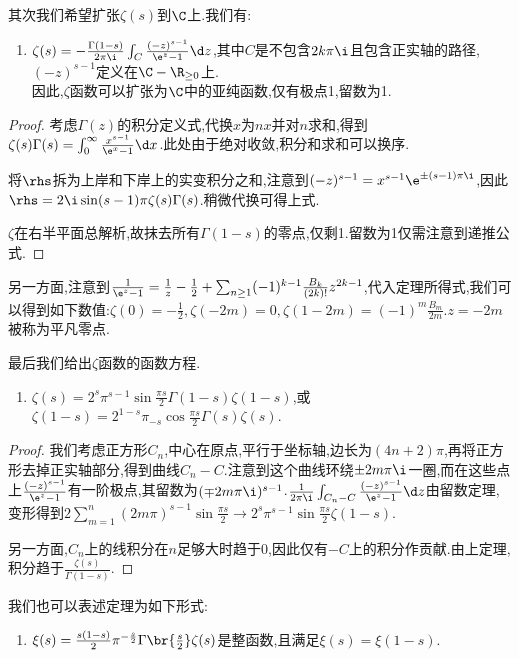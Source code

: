 \documentclass{article}
\begin{document}
其次我们希望扩张$\zeta(s)$到$\C$上.我们有:
\begin{enumerate}[resume]
    \item $\zeta(s)=-\frac{\Gamma(1-s)}{2\pi\i}\int_C\frac{(-z)^{s-1}}{\e^z-1}\d z$,其中$C$是不包含$2k\pi\i$且包含正实轴的路径,$(-z)^{s-1}$定义在$\C-\R_{\geq 0}$上.\\
    因此,$\zeta$函数可以扩张为$\C$中的亚纯函数,仅有极点1,留数为1.
\end{enumerate}
\begin{proof}
    考虑$\Gamma(z)$的积分定义式,代换$x$为$nx$并对$n$求和,得到$\zeta(s)\Gamma(s)=\int_0^\infty\frac{x^{s-1}}{\e^x-1}\d x$.此处由于绝对收敛,积分和求和可以换序.

    将$\rhs$拆为上岸和下岸上的实变积分之和,注意到$(-z)^{s-1}=x^{s-1}\e^{\pm(s-1)\pi\i}$,因此$\rhs=2\i\sin(s-1)\pi\zeta(s)\Gamma(s)$.稍微代换可得上式.

    $\zeta$在右半平面总解析,故抹去所有$\Gamma(1-s)$的零点,仅剩1.留数为1仅需注意到递推公式.
\end{proof}

另一方面,注意到$\frac{1}{\e^z-1}=\frac{1}{z}-\frac{1}{2}+\sum_{n\geq 1}(-1)^{k-1}\frac{B_k}{(2k)!}z^{2k-1}$,\hint{\tbc}代入定理所得式,我们可以得到如下数值:$\zeta(0)=-\frac{1}{2},\zeta(-2m)=0,\zeta(1-2m)=(-1)^m\frac{B_m}{2m}$.$z=-2m$被称为平凡零点.

最后我们给出$\zeta$函数的函数方程.
\begin{enumerate}[resume]
    \item $\zeta(s)=2^s\pi^{s-1}\sin\frac{\pi s}{2}\Gamma(1-s)\zeta(1-s)$,或$\zeta(1-s)=2^{1-s}\pi_{-s}\cos\frac{\pi s}{2}\Gamma(s)\zeta(s)$.
\end{enumerate}
\begin{proof}
    我们考虑正方形$C_n$,中心在原点,平行于坐标轴,边长为$(4n+2)\pi$,再将正方形去掉正实轴部分,得到曲线$C_n-C$.注意到这个曲线环绕$\pm 2m\pi\i$一圈,而在这些点上$\frac{(-z)^{s-1}}{\e^z-1}$有一阶极点,其留数为$(\mp 2m\pi\i)^{s-1}$.$\frac{1}{2\pi\i}\int_{C_n-C}\frac{(-z)^{s-1}}{\e^z-1}\d z$由留数定理,变形得到$2\sum_{m=1}^n(2m\pi)^{s-1}\sin\frac{\pi s}{2}\to 2^s\pi^{s-1}\sin\frac{\pi s}{2}\zeta(1-s)$.

    另一方面,$C_n$上的线积分在$n$足够大时趋于0,因此仅有$-C$上的积分作贡献.由上定理,积分趋于$\frac{\zeta(s)}{\Gamma(1-s)}$.
\end{proof}
我们也可以表述定理为如下形式:
\begin{enumerate}[resume]
    \item $\xi(s)=\frac{s(1-s)}{2}\pi^{-\frac{s}{2}}\Gamma\br{\frac{s}{2}}\zeta(s)$是整函数,且满足$\xi(s)=\xi(1-s)$.\\
\end{enumerate}
\end{document}
